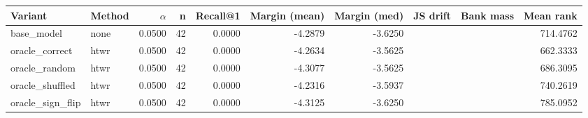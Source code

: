 \begin{tabular}{l l r r r r r r r r}
\toprule
Variant & Method & $\alpha$ & n & Recall@1 & Margin (mean) & Margin (med) & JS drift & Bank mass & Mean rank \\
\midrule
base\_model & none & 0.0500 & 42 & 0.0000 & -4.2879 & -3.6250 &  &  & 714.4762 \\
oracle\_correct & htwr & 0.0500 & 42 & 0.0000 & -4.2634 & -3.5625 &  &  & 662.3333 \\
oracle\_random & htwr & 0.0500 & 42 & 0.0000 & -4.3077 & -3.5625 &  &  & 686.3095 \\
oracle\_shuffled & htwr & 0.0500 & 42 & 0.0000 & -4.2316 & -3.5937 &  &  & 740.2619 \\
oracle\_sign\_flip & htwr & 0.0500 & 42 & 0.0000 & -4.3125 & -3.6250 &  &  & 785.0952 \\
\bottomrule
\end{tabular}
